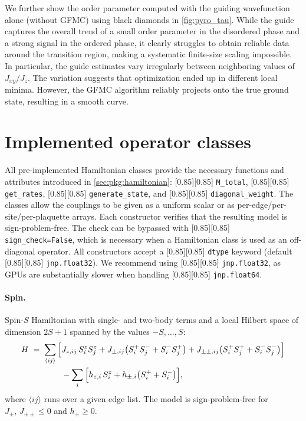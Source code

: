 \documentclass{SciPost}
\newcommand{\pyinline}[1]{\begingroup\setlength{\fboxsep}{0pt}%
  \colorbox{gray!15}{\raisebox{0pt}[0.85\ht\strutbox][0.85\dp\strutbox]{%
    \hspace{1pt}\lstinline{#1}\hspace{1pt}}}\endgroup}
\begin{document}
We further show the order parameter computed with the guiding wavefunction alone (without GFMC) using black diamonds in \autoref{fig:pyro_tau}.
%
While the guide captures the overall trend of a small order parameter in the disordered phase and a strong signal in the ordered phase, it clearly struggles to obtain reliable data around the transition region, making a systematic finite-size scaling impossible.
%
In particular, the guide estimates vary irregularly between neighboring values of $J_{xy}/J_z$.
%
The variation suggests that optimization ended up in different local minima.
%
However, the GFMC algorithm reliably projects onto the true ground state, resulting in a smooth curve.


\section{Implemented operator classes}\label{app:hamiltonians}
All pre-implemented Hamiltonian classes provide the necessary functions and attributes introduced in \autoref{sec:pkg:hamiltonian}: \pyinline{M_total}, \pyinline{get_rates}, \pyinline{generate_state}, and \pyinline{diagonal_weight}.
%
The classes allow the couplings to be given as a uniform scalar or as per-edge/per-site/per-plaquette arrays.
%
Each constructor verifies that the resulting model is sign-problem-free.
%
The check can be bypassed with \pyinline{sign_check=False}, which is necessary when a Hamiltonian class is used as an off-diagonal operator.
%
All constructors accept a \pyinline{dtype} keyword (default \pyinline{jnp.float32}).
%
We recommend using \pyinline{jnp.float32}, as GPUs are substantially slower when handling \pyinline{jnp.float64}.

\paragraph{Spin.}
Spin-$S$ Hamiltonian with single- and two-body terms and a local Hilbert space of dimension $2S+1$ spanned by the values $-S, \dots, S$:
\begin{align}
	H \;=\; \sum_{\langle ij \rangle} \Big[ &J_{z,ij}\, S^z_i S^z_j
		+ J_{\pm,ij} \big( S^+_i S^-_j + S^-_i S^+_j \big)
		+ J_{\pm\pm,ij} \big( S^+_i S^+_j + S^-_i S^-_j \big) \Big] \notag \\
		&- \sum_i \Big[ h_{z,i}\, S^z_i + h_{\pm,i} \big( S^+_i + S^-_i \big) \Big],
	\label{eq:H_spin_app}
\end{align}
where $\langle ij \rangle$ runs over a given edge list.
%
The model is sign-problem-free for $J_{\pm}, \, J_{\pm\pm} \leq 0$ and $h_{\pm} \geq 0$.
\end{document}
